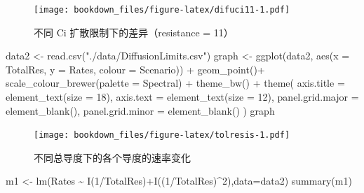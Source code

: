 \documentclass[
]{krantz}
\makeatletter
\newenvironment{Shaded}{\begin{snugshade}}{\end{snugshade}}
\newcommand{\AttributeTok}[1]{\textcolor[rgb]{0.77,0.63,0.00}{#1}}
\newcommand{\DecValTok}[1]{\textcolor[rgb]{0.00,0.00,0.81}{#1}}
\newcommand{\FunctionTok}[1]{\textcolor[rgb]{0.00,0.00,0.00}{#1}}
\newcommand{\NormalTok}[1]{#1}
\newcommand{\OtherTok}[1]{\textcolor[rgb]{0.56,0.35,0.01}{#1}}
\newcommand{\SpecialCharTok}[1]{\textcolor[rgb]{0.00,0.00,0.00}{#1}}
\newcommand{\StringTok}[1]{\textcolor[rgb]{0.31,0.60,0.02}{#1}}
\newenvironment{kframe}{%
\medskip{}
\setlength{\fboxsep}{.8em}
 \def\at@end@of@kframe{}%
 \ifinner\ifhmode%
  \def\at@end@of@kframe{\end{minipage}}%
  \begin{minipage}{\columnwidth}%
 \fi\fi%
 \def\FrameCommand##1{\hskip\@totalleftmargin \hskip-\fboxsep
 \colorbox{shadecolor}{##1}\hskip-\fboxsep
     \hskip-\linewidth \hskip-\@totalleftmargin \hskip\columnwidth}%
 \MakeFramed {\advance\hsize-\width
   \@totalleftmargin\z@ \linewidth\hsize
   \@setminipage}}%
 {\par\unskip\endMakeFramed%
 \at@end@of@kframe}
\renewenvironment{Shaded}{\begin{kframe}}{\end{kframe}}
\makeatother
\begin{document}
\begin{figure}
\centering
\texttt{[image: bookdown\_files/figure-latex/difuci11-1.pdf]}
\caption{\label{fig:difuci11}不同 Ci 扩散限制下的差异（resistance = 11）}
\end{figure}

\begin{Shaded}
\begin{Highlighting}[]
\NormalTok{data2 }\OtherTok{\textless{}{-}} \FunctionTok{read.csv}\NormalTok{(}\StringTok{"./data/DiffusionLimits.csv"}\NormalTok{)}
\NormalTok{graph }\OtherTok{\textless{}{-}} \FunctionTok{ggplot}\NormalTok{(data2, }\FunctionTok{aes}\NormalTok{(}\AttributeTok{x =}\NormalTok{ TotalRes, }\AttributeTok{y =}\NormalTok{ Rates, }\AttributeTok{colour =}\NormalTok{ Scenario)) }\SpecialCharTok{+}
  \FunctionTok{geom\_point}\NormalTok{()}\SpecialCharTok{+}
  \FunctionTok{scale\_colour\_brewer}\NormalTok{(}\AttributeTok{palette =} \StringTok{\textquotesingle{}Spectral\textquotesingle{}}\NormalTok{) }\SpecialCharTok{+}
  \FunctionTok{theme\_bw}\NormalTok{() }\SpecialCharTok{+}
  \FunctionTok{theme}\NormalTok{(}
    \AttributeTok{axis.title =} \FunctionTok{element\_text}\NormalTok{(}\AttributeTok{size =} \DecValTok{18}\NormalTok{),}
    \AttributeTok{axis.text =} \FunctionTok{element\_text}\NormalTok{(}\AttributeTok{size =} \DecValTok{12}\NormalTok{),}
    \AttributeTok{panel.grid.major =} \FunctionTok{element\_blank}\NormalTok{(),}
    \AttributeTok{panel.grid.minor =} \FunctionTok{element\_blank}\NormalTok{()}
\NormalTok{  )}
\NormalTok{graph}
\end{Highlighting}
\end{Shaded}

\begin{figure}
\centering
\texttt{[image: bookdown\_files/figure-latex/tolresis-1.pdf]}
\caption{\label{fig:tolresis}不同总导度下的各个导度的速率变化}
\end{figure}

\begin{Shaded}
\begin{Highlighting}[]
\NormalTok{m1 }\OtherTok{\textless{}{-}} \FunctionTok{lm}\NormalTok{(Rates }\SpecialCharTok{\textasciitilde{}} \FunctionTok{I}\NormalTok{(}\DecValTok{1}\SpecialCharTok{/}\NormalTok{TotalRes)}\SpecialCharTok{+}\FunctionTok{I}\NormalTok{((}\DecValTok{1}\SpecialCharTok{/}\NormalTok{TotalRes)}\SpecialCharTok{\^{}}\DecValTok{2}\NormalTok{),}\AttributeTok{data=}\NormalTok{data2)}
\FunctionTok{summary}\NormalTok{(m1)}
\end{Highlighting}
\end{Shaded}
\end{document}
